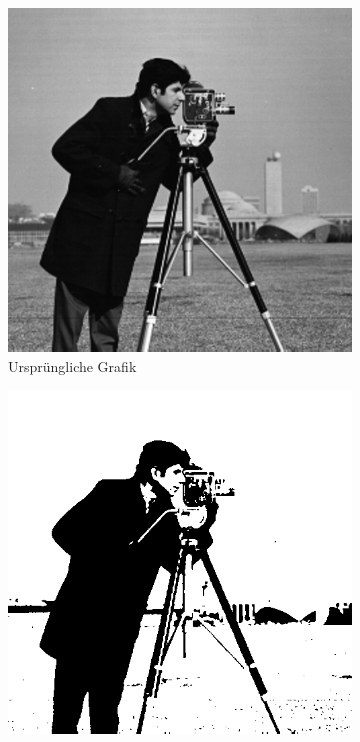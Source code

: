 \begin{figure}
    \begin{subfigure}[t]{0.3\textwidth}
        \centering
        \includegraphics[interpolate=true,width=\textwidth]{images/essentials_binarization_window_size}
        \caption{Ursprüngliche Grafik~\cite{scikit-image}}%
    \end{subfigure}
    \hfill
    \begin{subfigure}[t]{0.3\textwidth}
        \centering
        \includegraphics[interpolate=true,width=\textwidth]{images/essentials_binarization_window_size_otsu}

\end{subfigure}
\end{figure}
